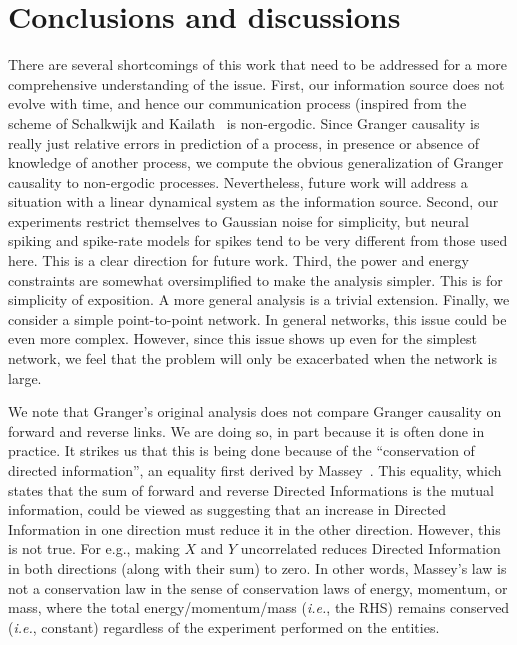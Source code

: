 \documentclass[conference]{IEEEtran}
\begin{document}
\section{Conclusions and discussions}
\label{sec:conclusions}

There are several shortcomings of this work that need to be addressed for a more comprehensive understanding of the issue. First, our information source does not evolve with time, and hence our communication process (inspired from the scheme of Schalkwijk and Kailath~\cite{S&K} is non-ergodic. Since Granger causality is really just relative errors in prediction of a process, in presence or absence of knowledge of another process, we compute the obvious generalization of Granger causality to non-ergodic processes. Nevertheless, future work will address a situation with a linear dynamical system as the information source. Second, our experiments restrict themselves to Gaussian noise for simplicity, but neural spiking and spike-rate models for spikes tend to be very different from those used here. This is a clear direction for future work. Third, the power and energy constraints are somewhat oversimplified to make the analysis simpler. This is for simplicity of exposition. A more general analysis is a trivial extension. Finally, we consider a simple point-to-point network. In general networks, this issue could be even more complex. However, since this issue shows up even for the simplest network, we feel that the problem will only be exacerbated when the network is large.

We note that Granger's original analysis does not compare Granger causality on forward and reverse links. We are doing so, in part because it is often done in practice. It strikes us that this is being done because of the ``conservation of directed information'', an equality first derived by Massey~\cite{massey2005conservation}. This equality, which states that the sum of forward and reverse Directed Informations is the mutual information, could be viewed as suggesting that an increase in Directed Information in one direction must reduce it in the other direction. However, this is not true. For e.g., making $X$ and $Y$ uncorrelated reduces Directed Information in both directions (along with their sum) to zero. In other words, Massey's law is not a conservation law in the sense of conservation laws of energy, momentum, or mass, where the total energy/momentum/mass (\textit{i.e.}, the RHS) remains conserved (\textit{i.e.}, constant) regardless of the experiment performed on the entities.
\end{document}
